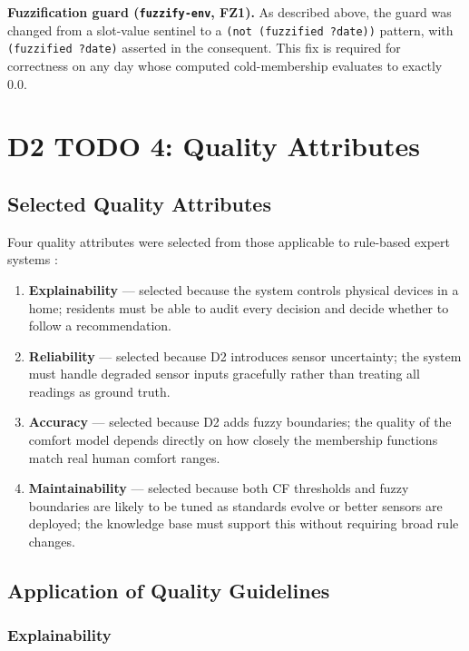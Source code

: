 \documentclass{article}
\begin{document}
\textbf{Fuzzification guard (\texttt{fuzzify-env}, FZ1).}
As described above, the guard was changed from a slot-value sentinel to a \texttt{(not (fuzzified ?date))} pattern, with \texttt{(fuzzified ?date)} asserted in the consequent.
This fix is required for correctness on any day whose computed cold-membership evaluates to exactly 0.0.



\section{D2 TODO 4: Quality Attributes}

\subsection{Selected Quality Attributes}

Four quality attributes were selected from those applicable to rule-based expert systems \cite{giarratano_riley}:

\begin{enumerate}
    \item \textbf{Explainability} — selected because the system controls physical devices in a home; residents must be able to audit every decision and decide whether to follow a recommendation.
    \item \textbf{Reliability} — selected because D2 introduces sensor uncertainty; the system must handle degraded sensor inputs gracefully rather than treating all readings as ground truth.
    \item \textbf{Accuracy} — selected because D2 adds fuzzy boundaries; the quality of the comfort model depends directly on how closely the membership functions match real human comfort ranges.
    \item \textbf{Maintainability} — selected because both CF thresholds and fuzzy boundaries are likely to be tuned as standards evolve or better sensors are deployed; the knowledge base must support this without requiring broad rule changes.
\end{enumerate}

\subsection{Application of Quality Guidelines}

\subsubsection{Explainability}
\end{document}

